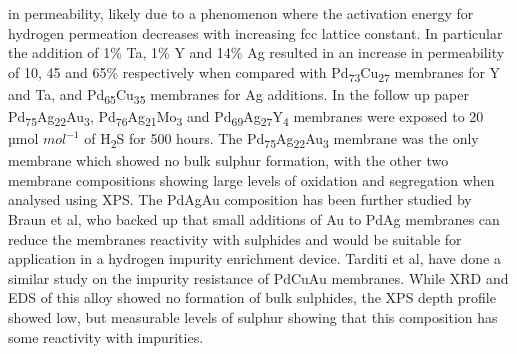 in permeability, likely due to a phenomenon where the activation energy for hydrogen 
permeation decreases with increasing fcc lattice constant. \cite{He2013} In particular the addition of 
1\% Ta, 1\% Y and 14\% Ag resulted in an increase in permeability of 10, 45 and 65\% 
respectively when compared with Pd\textsubscript{73}Cu\textsubscript{27} membranes for 
Y and Ta, and Pd\textsubscript{65}Cu\textsubscript{35} membranes for Ag additions. \cite{He2013} 
In the follow up paper Pd\textsubscript{75}Ag\textsubscript{22}Au\textsubscript{3},
Pd\textsubscript{76}Ag\textsubscript{21}Mo\textsubscript{3} and Pd\textsubscript{69}Ag\textsubscript{27}Y\textsubscript{4} 
membranes were exposed to 20 µmol $mol^{-1}$ of H\textsubscript{2}S for 500 hours. 
The Pd\textsubscript{75}Ag\textsubscript{22}Au\textsubscript{3} membrane was the only 
membrane which showed no bulk sulphur formation, with the other two membrane compositions 
showing large levels of oxidation and segregation when analysed using XPS. \cite{Peters2015} The 
PdAgAu composition has been further studied by Braun et al, \cite{Braun2014a} who backed up that small 
additions of Au to PdAg membranes can reduce the membranes reactivity with sulphides and 
would be suitable for application in a hydrogen impurity enrichment device. 
Tarditi et al, have done a similar study on the impurity resistance of PdCuAu membranes. \cite{Tarditi2014} 
While XRD and EDS of this alloy showed no formation of bulk sulphides, the XPS depth 
profile showed low, but measurable levels of sulphur showing that this composition has some 
reactivity with impurities. \cite{Tarditi2014}


\eject \pdfpagewidth=16.5in \pdfpageheight=11.7in

